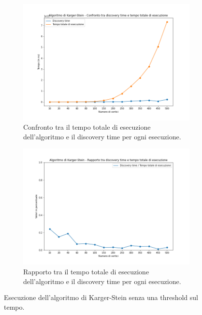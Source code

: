 \begin{figure}[H]
	\begin{subfigure}{.5\textwidth}
		\centering
		\includegraphics[width=1\textwidth]{res/images/single/karger-stein/discovery-time/karger_stein_confronto_discovery_time_total_time.png}
		\caption{Confronto tra il tempo totale di esecuzione dell'algoritmo e il discovery time per ogni esecuzione.}
		\label{fig:karger_stein_confronto_discovery_time_total_time}
	\end{subfigure}
	\begin{subfigure}{.5\textwidth}
		\centering
		\includegraphics[width=1\textwidth]{res/images/single/karger-stein/discovery-time/karger_stein_rapporto_discovery_time_total_time.png}
		\caption{Rapporto tra il tempo totale di esecuzione dell'algoritmo 
		e il discovery time per ogni esecuzione.}
		\label{fig:karger_stein_rapporto_discovery_time_total_time}
	\end{subfigure}
	\caption{Esecuzione dell'algoritmo di Karger-Stein senza una threshold sul tempo.}
	\label{fig:karger_stein_discovery_time}
\end{figure}

